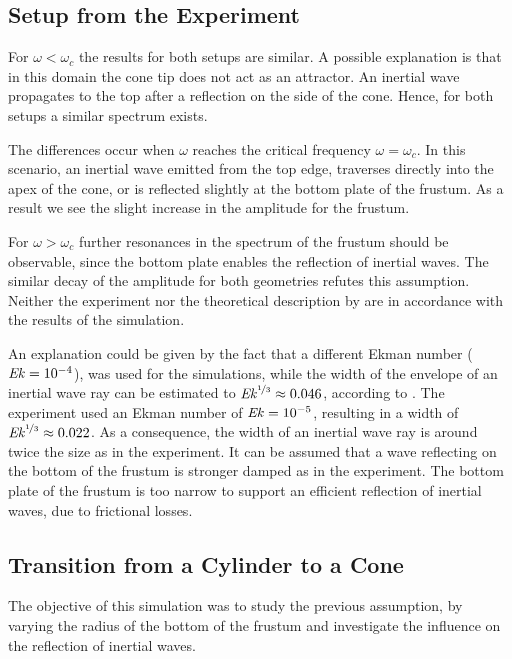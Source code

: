 \subsection{Setup from the Experiment}
\label{cone:discussion_experiment}

For $\omega < \omega_c$ the results for both setups are similar.
A possible explanation is that in this domain the cone tip does not act as an attractor.
An inertial wave propagates to the top after a reflection on the side of the cone.
Hence, for both setups a similar spectrum exists.

The differences occur when $\omega$ reaches the critical frequency $\omega = \omega_c$. In this scenario, an inertial wave emitted from the
top edge, traverses directly into the apex of the cone, or is reflected slightly at the bottom plate of the frustum.
As a result we see the slight increase in the amplitude for the frustum.

For $\omega > \omega_c$ further resonances in the spectrum of the frustum should be observable,
since the bottom plate enables the reflection of inertial waves.
The similar decay of the amplitude for both geometries refutes this assumption.
Neither the experiment \citep{Beardsley1970} nor the theoretical description by \citep{Greenspan1990}
are in accordance with the results of the simulation.

An explanation could be given by the fact that a different Ekman number ($\mbox{\textit{Ek}} = 10^{-4}$), was used for the simulations,
while the width of the envelope of an inertial wave ray can be estimated to $\mbox{\textit{Ek}}^{\nicefrac{1}{3}}\approx 0.046$, according to \citep{Tilgner2000}.
The experiment used an Ekman number of $\mbox{\textit{Ek}} = 10^{-5}$, resulting in a  width of $\mbox{\textit{Ek}}^{\nicefrac{1}{3}}\approx 0.022$.
As a consequence, the width of an inertial wave ray is around twice the size as in the experiment.
It can be assumed that a wave reflecting on the bottom of the frustum
is stronger damped as in the experiment.
The bottom plate of the frustum is too narrow to support an efficient reflection
of inertial waves, due to frictional losses.\\

\clearpage

\subsection{Transition from a Cylinder to a Cone}
\label{cone:discussion_transition}

The objective of this simulation was to study the previous assumption,
by varying the radius of the bottom of the frustum and investigate the influence
on the reflection of inertial waves.

